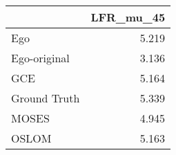 \begin{tabular}{lr}
\toprule
{} & LFR_mu_45 \\
\midrule
Ego          &     5.219 \\
Ego-original &     3.136 \\
GCE          &     5.164 \\
Ground Truth &     5.339 \\
MOSES        &     4.945 \\
OSLOM        &     5.163 \\
\bottomrule
\end{tabular}
